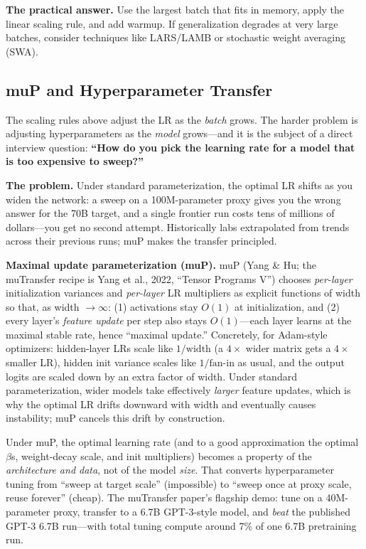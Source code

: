 \textbf{The practical answer.} Use the largest batch that fits in memory, apply the linear scaling rule, and add warmup. If generalization degrades at very large batches, consider techniques like LARS/LAMB or stochastic weight averaging (SWA).

\subsection{muP and Hyperparameter Transfer}
\label{subsec:mup}

The scaling rules above adjust the LR as the \emph{batch} grows. The harder problem is adjusting hyperparameters as the \emph{model} grows---and it is the subject of a direct interview question: \textbf{``How do you pick the learning rate for a model that is too expensive to sweep?''}

\textbf{The problem.} Under standard parameterization, the optimal LR shifts as you widen the network: a sweep on a 100M-parameter proxy gives you the wrong answer for the 70B target, and a single frontier run costs tens of millions of dollars---you get no second attempt. Historically labs extrapolated from trends across their previous runs; muP makes the transfer principled.

\textbf{Maximal update parameterization (muP).} muP (Yang \& Hu; the muTransfer recipe is Yang et al., 2022, ``Tensor Programs V'') chooses \emph{per-layer} initialization variances and \emph{per-layer} LR multipliers as explicit functions of width so that, as width $\to \infty$: (1) activations stay $O(1)$ at initialization, and (2) every layer's \emph{feature update} per step also stays $O(1)$---each layer learns at the maximal stable rate, hence ``maximal update.'' Concretely, for Adam-style optimizers: hidden-layer LRs scale like $1/\text{width}$ (a $4\times$ wider matrix gets a $4\times$ smaller LR), hidden init variance scales like $1/\text{fan-in}$ as usual, and the output logits are scaled down by an extra factor of width. Under standard parameterization, wider models take effectively \emph{larger} feature updates, which is why the optimal LR drifts downward with width and eventually causes instability; muP cancels this drift by construction.

\begin{keyinsight}
Under muP, the optimal learning rate (and to a good approximation the optimal $\beta$s, weight-decay scale, and init multipliers) becomes a property of the \emph{architecture and data}, not of the model \emph{size}. That converts hyperparameter tuning from ``sweep at target scale'' (impossible) to ``sweep once at proxy scale, reuse forever'' (cheap). The muTransfer paper's flagship demo: tune on a 40M-parameter proxy, transfer to a 6.7B GPT-3-style model, and \emph{beat} the published GPT-3 6.7B run---with total tuning compute around 7\% of one 6.7B pretraining run.
\end{keyinsight}

